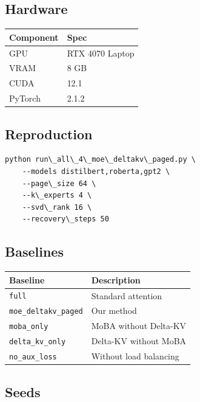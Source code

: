 \subsection{Hardware}

\begin{table}[H]
\centering
\small
\begin{tabular}{ll}
\toprule
\textbf{Component} & \textbf{Spec} \\
\midrule
GPU & RTX 4070 Laptop \\
VRAM & 8 GB \\
CUDA & 12.1 \\
PyTorch & 2.1.2 \\
\bottomrule
\end{tabular}
\end{table}

\subsection{Reproduction}

\begin{lstlisting}
python run\_all\_4\_moe\_deltakv\_paged.py \
    --models distilbert,roberta,gpt2 \
    --page\_size 64 \
    --k\_experts 4 \
    --svd\_rank 16 \
    --recovery\_steps 50
\end{lstlisting}

\subsection{Baselines}

\begin{table}[H]
\centering
\small
\begin{tabular}{ll}
\toprule
\textbf{Baseline} & \textbf{Description} \\
\midrule
\texttt{full} & Standard attention \\
\texttt{moe\_deltakv\_paged} & Our method \\
\texttt{moba\_only} & MoBA without Delta-KV \\
\texttt{delta\_kv\_only} & Delta-KV without MoBA \\
\texttt{no\_aux\_loss} & Without load balancing \\
\bottomrule
\end{tabular}
\end{table}

\subsection{Seeds}

